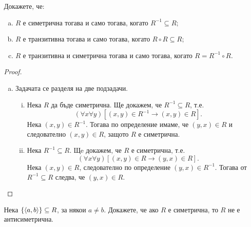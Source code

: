   
\begin{problem}
  Докажете, че:
  \begin{enumerate}[a)]
  \item
    $R$ е симетрична тогава и само тогава, когато $R^{-1}\subseteq R$;
  \item
    $R$ е транзитивна тогава и само тогава, когато $R\circ R\subseteq R$;
  \item
    $R$ е транзитивна и симетрична тогава и само тогава, когато $R = R^{-1}\circ R$.
\end{enumerate}
\end{problem}
\begin{proof}
  \begin{enumerate}[a)]
  \item
    Задачата се разделя на две подзадачи.
    \begin{enumerate}[(i)]
    \item
      Нека $R$ да бъде симетрична. Ще докажем, че $R^{-1}\subseteq R$, т.е.
      \[(\forall x\forall y)[(x,y)\in R^{-1} \rightarrow (x,y)\in R].\]
      Нека $(x,y)\in R^{-1}$. Тогава по определение имаме, че $(y,x)\in R$ и следователно $(x,y)\in R$,
      защото $R$ е симетрична.
    \item
      Нека $R^{-1}\subseteq R$. Щe докажем, че $R$ е симетрична, т.е.
      \[(\forall x\forall y)[(x,y)\in R \rightarrow (y,x)\in R].\]
      Нека $(x,y)\in R$, следователно по определение $(y,x)\in R^{-1}$.
      Тогава от $R^{-1}\subseteq R$ следва, че $(y,x)\in R$.
    \end{enumerate}
  \end{enumerate}
\end{proof}

\begin{problem}
  Нека $\{\langle{a,b}\rangle\}\subseteq R$, за някои $a\neq b$.
  Докажете, че ако $R$ е симетрична, то $R$ не е антисиметрична.
\end{problem}

